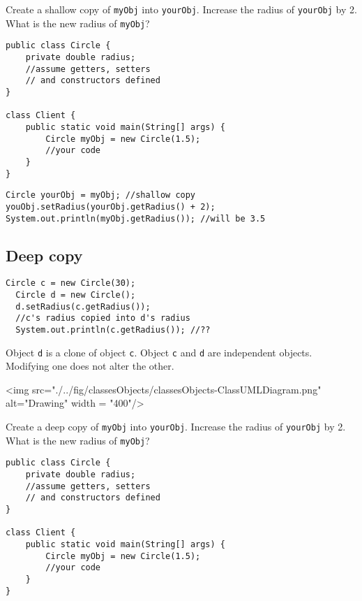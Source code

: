 \begin{exercise}
Create a shallow copy of \texttt{myObj} into \texttt{yourObj}. Increase the radius of \texttt{yourObj} by 2. What is the new radius of \texttt{myObj}?

\begin{lstlisting}[frame=single,style=buggy,backgroundcolor = \color{green!10!white}]
public class Circle {
	private double radius;
	//assume getters, setters 
	// and constructors defined
}

class Client {
	public static void main(String[] args) {
		Circle myObj = new Circle(1.5);
		//your code
	}
}
\end{lstlisting}  	
\end{exercise}
\begin{answer} \begin{lstlisting}
Circle yourObj = myObj; //shallow copy
youObj.setRadius(yourObj.getRadius() + 2);
System.out.println(myObj.getRadius()); //will be 3.5
\end{lstlisting} \end{answer}


\subsection{Deep copy}
  \begin{lstlisting}[style=correct,basicstyle=\footnotesize]
  Circle c = new Circle(30);
  Circle d = new Circle();
  d.setRadius(c.getRadius());
  //c's radius copied into d's radius
  System.out.println(c.getRadius()); //??
  \end{lstlisting}    
  
  Object \texttt{d} is a clone of object \texttt{c}. Object \texttt{c} and \texttt{d} are independent objects. Modifying one does not alter the other.

\begin{center}
<img src="./../fig/classesObjects/classesObjects-ClassUMLDiagram.png" alt="Drawing" width = "400"/>
\end{center}

  
\begin{exercise}
Create a deep copy of \texttt{myObj} into \texttt{yourObj}. Increase the radius of \texttt{yourObj} by 2. What is the new radius of \texttt{myObj}?

\begin{lstlisting}[frame=single,style=buggy]
public class Circle {
	private double radius;
	//assume getters, setters
	// and constructors defined
}

class Client {
	public static void main(String[] args) {
		Circle myObj = new Circle(1.5);
		//your code
	}
}
\end{lstlisting}  	
\end{exercise}

